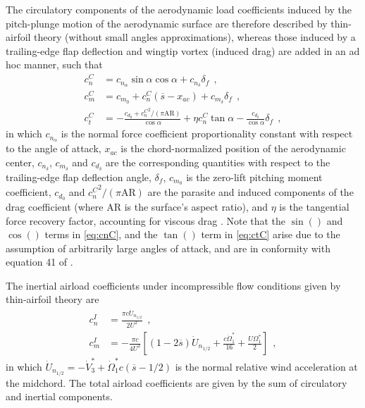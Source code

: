 \documentclass[journal]{new-aiaa}
\def\lb{\left[}
\def\rb{\right]}
\def\lp{\left(}
\def\rp{\right)}
\begin{document}
The circulatory components of the aerodynamic load coefficients induced by the pitch-plunge motion of the aerodynamic surface are therefore described by thin-airfoil theory (without small angles approximations), whereas those induced by a trailing-edge flap deflection and wingtip vortex (induced drag) are added in an ad hoc manner, such that
\begin{align}
    c_n^C &= c_{n_{\alpha}}\sin{\alpha}\cos{\alpha} + c_{n_{\delta}}\delta_f \ \ ,
    \label{eq:cnC}
    \\
    c_m^C &= c_{m_0} + c_n^C\lp\overline{s}-x_{ac}\rp + c_{m_{\delta}}\delta_f \ \ ,
    \label{eq:cmC}
    \\
    c_t^C &= -\frac{c_{d_0}+{c_n^C}^2/(\pi \mathrm{AR})}{\cos{\alpha}} + \eta c_n^C\tan{\alpha} - \frac{c_{d_{\delta}}}{\cos{\alpha}} \delta_f \ \ ,
    \label{eq:ctC}
\end{align}
in which $c_{n_{\alpha}}$ is the normal force coefficient proportionality constant with respect to the angle of attack, $x_{ac}$ is the chord-normalized position of the aerodynamic center, $c_{n_{\delta}}$, $c_{m_{\delta}}$ and $c_{d_{\delta}}$ are the corresponding quantities with respect to the trailing-edge flap deflection angle, $\delta_f$, $c_{m_0}$ is the zero-lift pitching moment coefficient, $c_{d_0}$ and ${c_n^C}^2/(\pi \mathrm{AR})$ are the parasite and induced components of the drag coefficient (where $\mathrm{AR}$ is the surface's aspect ratio), and $\eta$ is the tangential force recovery factor, accounting for viscous drag \cite{leishman2006principles}. Note that the $\sin()$ and $\cos()$ terms in \cref{eq:cnC}, and the $\tan()$ term in \cref{eq:ctC} arise due to the assumption of arbitrarily large angles of attack, and are in conformity with equation 41 of \cite{peters2007state}.

The inertial airload coefficients under incompressible flow conditions given by thin-airfoil theory \cite{leishman2006principles} are
\begin{align}
    c_n^I &= \frac{\pi c \dot{U}_{n_{1/2}}}{2U^2} \ \ ,
    \label{eq:cnI}
    \\
    c_m^I &= -\frac{\pi c}{4U^2}\lb\lp1-2\overline{s}\rp\dot{U}_{n_{1/2}} + \frac{c\dot{\Omega}^{*}_1}{16} + \frac{U\Omega^{*}_1}{2}\rb \ \ ,
    \label{eq:cmI}
\end{align}
in which $\dot{U}_{n_{1/2}}=-\dot{V}^{*}_3+\dot{\Omega}^{*}_1 c\lp \overline{s}-1/2 \rp$ is the normal relative wind acceleration at the midchord. The total airload coefficients are given by the sum of circulatory and inertial components.
\end{document}
